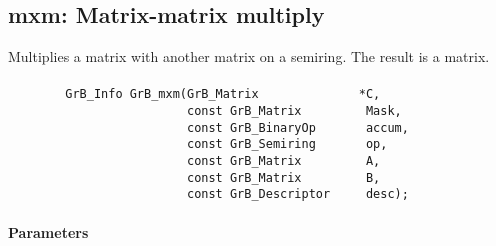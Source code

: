 \subsection{{\sf mxm}: Matrix-matrix multiply}

Multiplies a matrix with another matrix on a semiring. The result is a matrix.

\paragraph{\syntax}

\begin{verbatim}
        GrB_Info GrB_mxm(GrB_Matrix              *C,
                         const GrB_Matrix         Mask,
                         const GrB_BinaryOp       accum,
                         const GrB_Semiring       op,
                         const GrB_Matrix         A, 
                         const GrB_Matrix         B,
                         const GrB_Descriptor     desc);
\end{verbatim}

\paragraph{Parameters}

